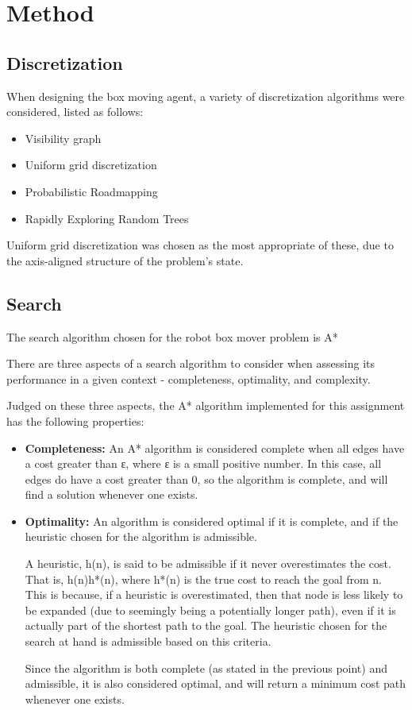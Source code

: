 \section{Method}

\subsection{Discretization}
When designing the box moving agent, a variety of discretization algorithms were considered, listed as follows:

\begin{itemize}
\item Visibility graph
\item Uniform grid discretization
\item Probabilistic Roadmapping
\item Rapidly Exploring Random Trees
\end{itemize}

Uniform grid discretization was chosen as the most appropriate of these, due to the axis-aligned structure of the problem’s state.


\subsection{Search}
The search algorithm chosen for the robot box mover problem is A*

There are three aspects of a search algorithm to consider when assessing its performance in a given context - completeness, optimality, and complexity.

Judged on these three aspects, the A* algorithm implemented for this assignment has the following properties:

\begin{itemize}
\item \textbf{Completeness:} An A* algorithm is considered complete when all edges have a cost greater than ε, where ε is a small positive number. In this case, all edges do have a cost greater than 0, so the algorithm is complete, and will find a solution whenever one exists.
\item \textbf{Optimality:} An algorithm is considered optimal if it is complete, and if the heuristic chosen for the algorithm is admissible.

A heuristic, h(n), is said to be admissible if it never overestimates the cost. That is, h(n)h*(n), where h*(n) is the true cost to reach the goal from n. This is because, if a heuristic is overestimated, then that node is less likely to be expanded (due to seemingly being a potentially longer path), even if it is actually part of the shortest path to the goal. The heuristic chosen for the search at hand is admissible based on this criteria.

Since the algorithm is both complete (as stated in the previous point) and admissible, it is also considered optimal, and will return a minimum cost path whenever one exists.
\end{itemize}